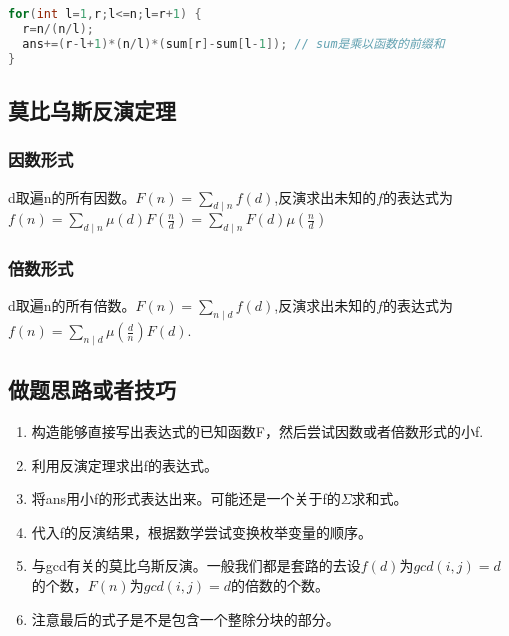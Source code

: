 		\begin{lstlisting}[language={c++}]
for(int l=1,r;l<=n;l=r+1) {
  r=n/(n/l);
  ans+=(r-l+1)*(n/l)*(sum[r]-sum[l-1]); // sum是乘以函数的前缀和 
}
		\end{lstlisting}

		\subsection{莫比乌斯反演定理}
			\subsubsection{因数形式}
			\par d取遍n的所有因数。$F(n)=\sum\limits_{d \mid n}f(d)$,反演求出未知的$f$的表达式为$f(n)=\sum\limits_{d \mid n}\mu(d)F(\frac{n}{d})=\sum\limits_{d \mid n}F(d)\mu(\frac{n}{d})$
			\subsubsection{倍数形式}
			\par d取遍n的所有倍数。$F(n)=\sum\limits_{n \mid d}{f(d)}$,反演求出未知的$f$的表达式为$f(n)=\sum\limits_{n \mid d}{\mu(\frac{d}{n})F(d)}$.
		\subsection{做题思路或者技巧}
			\begin{enumerate}
				\item 构造能够直接写出表达式的已知函数F，然后尝试因数或者倍数形式的小f.
				\item 利用反演定理求出f的表达式。
				\item 将ans用小f的形式表达出来。可能还是一个关于f的$\Sigma$求和式。
				\item 代入f的反演结果，根据数学尝试变换枚举变量的顺序。
				\item 与gcd有关的莫比乌斯反演。一般我们都是套路的去设$f(d)$\mbox{为}$gcd(i,j)=d$\mbox{的个数}，$F(n)$\mbox{为}$gcd(i,j)=d\mbox{的倍数}$的个数。
				\item 注意最后的式子是不是包含一个整除分块的部分。
			\end{enumerate}

			\begin{lstlisting}[language={c++}]
			\end{lstlisting}
